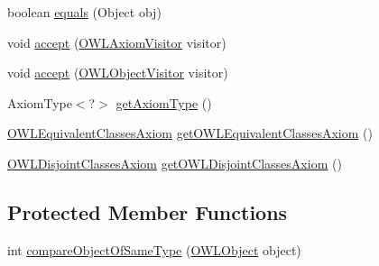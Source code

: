 \begin{DoxyCompactItemize}
\item 
boolean \hyperlink{classuk_1_1ac_1_1manchester_1_1cs_1_1owl_1_1owlapi_1_1_o_w_l_disjoint_union_axiom_impl_a1bc1f71270a00ecf729a2bbd6eb1c94d}{equals} (Object obj)
\item 
void \hyperlink{classuk_1_1ac_1_1manchester_1_1cs_1_1owl_1_1owlapi_1_1_o_w_l_disjoint_union_axiom_impl_a2ddcd277c2db7838109729635a628cd8}{accept} (\hyperlink{interfaceorg_1_1semanticweb_1_1owlapi_1_1model_1_1_o_w_l_axiom_visitor}{O\-W\-L\-Axiom\-Visitor} visitor)
\item 
void \hyperlink{classuk_1_1ac_1_1manchester_1_1cs_1_1owl_1_1owlapi_1_1_o_w_l_disjoint_union_axiom_impl_afdd7d24f8705f89c1d4fc7d4dee07928}{accept} (\hyperlink{interfaceorg_1_1semanticweb_1_1owlapi_1_1model_1_1_o_w_l_object_visitor}{O\-W\-L\-Object\-Visitor} visitor)
\item 
Axiom\-Type$<$?$>$ \hyperlink{classuk_1_1ac_1_1manchester_1_1cs_1_1owl_1_1owlapi_1_1_o_w_l_disjoint_union_axiom_impl_a458fcd36db2977757ea009b026d0049d}{get\-Axiom\-Type} ()
\item 
\hyperlink{interfaceorg_1_1semanticweb_1_1owlapi_1_1model_1_1_o_w_l_equivalent_classes_axiom}{O\-W\-L\-Equivalent\-Classes\-Axiom} \hyperlink{classuk_1_1ac_1_1manchester_1_1cs_1_1owl_1_1owlapi_1_1_o_w_l_disjoint_union_axiom_impl_aaa5776bb9ec248426855f7e03a5d7f01}{get\-O\-W\-L\-Equivalent\-Classes\-Axiom} ()
\item 
\hyperlink{interfaceorg_1_1semanticweb_1_1owlapi_1_1model_1_1_o_w_l_disjoint_classes_axiom}{O\-W\-L\-Disjoint\-Classes\-Axiom} \hyperlink{classuk_1_1ac_1_1manchester_1_1cs_1_1owl_1_1owlapi_1_1_o_w_l_disjoint_union_axiom_impl_afd1da9ad98991361bc961fae7b0139c1}{get\-O\-W\-L\-Disjoint\-Classes\-Axiom} ()
\end{DoxyCompactItemize}
\subsection*{Protected Member Functions}
\begin{DoxyCompactItemize}
\item 
int \hyperlink{classuk_1_1ac_1_1manchester_1_1cs_1_1owl_1_1owlapi_1_1_o_w_l_disjoint_union_axiom_impl_a74d745191f10c0f0a968900a6a20d2d3}{compare\-Object\-Of\-Same\-Type} (\hyperlink{interfaceorg_1_1semanticweb_1_1owlapi_1_1model_1_1_o_w_l_object}{O\-W\-L\-Object} object)
\end{DoxyCompactItemize}
